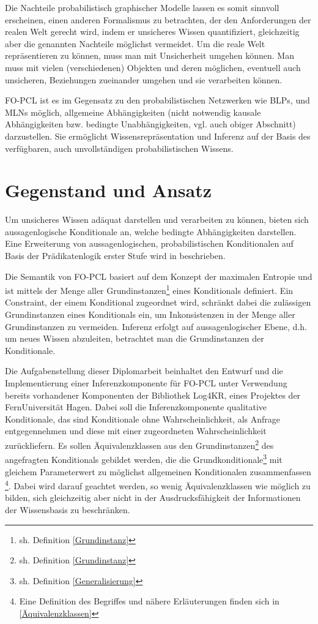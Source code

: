 \documentclass[a4paper, 11pt]{book}
\begin{document}
Die Nachteile probabilistisch graphischer Modelle lassen es somit sinnvoll erscheinen, einen anderen Formalismus zu betrachten, der den Anforderungen der realen Welt  gerecht wird, indem er unsicheres Wissen quantifiziert, gleichzeitig aber die genannten Nachteile möglichst vermeidet. Um die reale Welt repräsentieren zu können, muss man mit Unsicherheit umgehen können. Man muss mit vielen (verschiedenen) Objekten und deren möglichen, eventuell auch unsicheren, Beziehungen zueinander umgehen und sie verarbeiten können.

FO-PCL ist es im Gegensatz zu den probabilistischen Netzwerken wie BLPs, und MLNs möglich, allgemeine Abhängigkeiten (nicht notwendig kausale Abhängigkeiten bzw. bedingte Unabhängigkeiten, vgl. auch obiger Abschnitt) darzustellen. Sie ermöglicht Wissensrepräsentation und Inferenz auf der Basis des verfügbaren, auch unvollständigen probabilistischen Wissens. 


\section{Gegenstand und Ansatz}
Um unsicheres Wissen adäquat darstellen und verarbeiten zu können, bieten sich aussagenlogische Konditionale  an, welche bedingte Abhängigkeiten darstellen. Eine Erweiterung von aussagenlogischen, probabilistischen Konditionalen auf Basis der Prädikatenlogik erster Stufe wird in \cite[Kap. 6]{Fis10} beschrieben.

 Die Semantik von FO-PCL basiert auf dem Konzept der maximalen Entropie und ist mittels der Menge aller Grundinstanzen\footnote{sh. Definition \ref{Grundinstanz}} eines Konditionals definiert. Ein Constraint, der einem Konditional zugeordnet wird, schränkt dabei die zulässigen Grundinstanzen eines Konditionals ein, um Inkonsistenzen in der Menge aller Grundinstanzen zu vermeiden.
 Inferenz erfolgt auf aussagenlogischer Ebene, d.h. um neues Wissen abzuleiten, betrachtet man die Grundinstanzen der Konditionale.


Die Aufgabenstellung dieser Diplomarbeit beinhaltet den Entwurf und die Implementierung einer Inferenzkomponente für FO-PCL unter Verwendung bereits vorhandener Komponenten der Bibliothek Log4KR, eines Projektes der FernUniversität Hagen. Dabei soll die Inferenzkomponente qualitative Konditionale, das sind Konditionale ohne Wahrscheinlichkeit, als Anfrage entgegennehmen und diese mit einer zugeordneten Wahrscheinlichkeit zurückliefern. Es sollen Äquivalenzklassen   aus den Grundinstanzen\footnote{sh. Definition \ref{Grundinstanz}}  des angefragten Konditionals gebildet werden, die die Grundkonditionale\footnote{sh. Definition \ref{Generalisierung}} mit gleichem Parameterwert zu möglichst allgemeinen Konditionalen zusammenfassen \footnote{Eine Definition des Begriffes und nähere Erläuterungen finden sich in \ref{Äquivalenzklassen}}. Dabei wird darauf geachtet werden, so wenig Äquivalenzklassen wie möglich zu bilden, sich gleichzeitig aber nicht in der Ausdrucksfähigkeit der Informationen der Wissensbasis zu beschränken.
\end{document}
